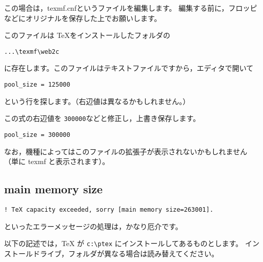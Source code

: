 \documentclass[fleqn,a4j]{jarticle}
\begin{document}
この場合は，\textsf{texmf.cnf}というファイルを編集します。
編集する前に，フロッピなどにオリジナルを保存した上でお願いします。

このファイルは \TeX をインストールしたフォルダの
\begin{jquote}
\begin{verbatim}
...\texmf\web2c
\end{verbatim}
\end{jquote}
に存在します。このファイルはテキストファイルですから，エディタで開いて
\begin{jquote}
\begin{verbatim}
pool_size = 125000
\end{verbatim}
\end{jquote}
という行を探します。（右辺値は異なるかもしれません。）

この式の右辺値を \texttt{300000}などと修正し，上書き保存します。
\begin{jquote}
\begin{verbatim}
pool_size = 300000
\end{verbatim}
\end{jquote}

なお，機種によってはこのファイルの拡張子が表示されないかもしれません
（単に texmf と表示されます）。

\subsection{main memory size}
\begin{jquote}%
\begin{verbatim}
! TeX capacity exceeded, sorry [main memory size=263001].
\end{verbatim}
\end{jquote}
といったエラーメッセージの処理は，かなり厄介です。

以下の記述では，TeX が \verb/c:\ptex/ にインストールしてあるものとします。
インストールドライブ，フォルダが異なる場合は読み替えてください。
\end{document}
